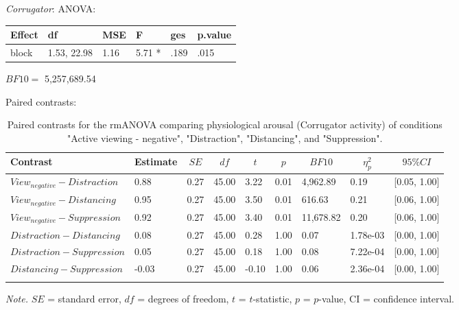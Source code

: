\documentclass[
  english,
  man,floatsintext]{apa6}
\begin{document}
\emph{Corrugator}:
ANOVA:

\begin{tabular}{l|l|l|l|l|l}
\hline
Effect & df & MSE & F & ges & p.value\\
\hline
block & 1.53, 22.98 & 1.16 & 5.71 * & .189 & .015\\
\hline
\end{tabular}

\(BF10=\) 5,257,689.54

Paired contrasts:

\begin{table}[H]

\begin{center}
\begin{threeparttable}

\caption{\label{tab:unnamed-chunk-7}Paired contrasts for the rmANOVA comparing physiological arousal (Corrugator activity) of conditions "Active viewing - negative", "Distraction", "Distancing", and "Suppression".}

\begin{tabular}{lllllllll}
\toprule
Contrast & \multicolumn{1}{c}{Estimate} & \multicolumn{1}{c}{$SE$} & \multicolumn{1}{c}{$df$} & \multicolumn{1}{c}{$t$} & \multicolumn{1}{c}{$p$} & \multicolumn{1}{c}{$BF10$} & \multicolumn{1}{c}{$\eta_{p}^{2}$} & \multicolumn{1}{c}{$95\% CI$}\\
\midrule
$View_{negative} - Distraction$ & 0.88 & 0.27 & 45.00 & 3.22 & 0.01 & 4,962.89 & 0.19 & {}[0.05, 1.00]\\
$View_{negative} - Distancing$ & 0.95 & 0.27 & 45.00 & 3.50 & 0.01 & 616.63 & 0.21 & {}[0.06, 1.00]\\
$View_{negative} - Suppression$ & 0.92 & 0.27 & 45.00 & 3.40 & 0.01 & 11,678.82 & 0.20 & {}[0.06, 1.00]\\
$Distraction - Distancing$ & 0.08 & 0.27 & 45.00 & 0.28 & 1.00 & 0.07 & 1.78e-03 & {}[0.00, 1.00]\\
$Distraction - Suppression$ & 0.05 & 0.27 & 45.00 & 0.18 & 1.00 & 0.08 & 7.22e-04 & {}[0.00, 1.00]\\
$Distancing - Suppression$ & -0.03 & 0.27 & 45.00 & -0.10 & 1.00 & 0.06 & 2.36e-04 & {}[0.00, 1.00]\\
\bottomrule
\addlinespace
\end{tabular}

\begin{tablenotes}[para]
\normalsize{\textit{Note.} $SE$ = standard error, $df$ = degrees of freedom, $t$ = $t$-statistic, $p$ = $p$-value, CI = confidence interval.}
\end{tablenotes}

\end{threeparttable}
\end{center}

\end{table}
\end{document}
